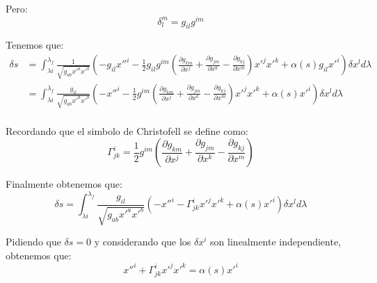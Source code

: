 \documentclass[12pt]{report}
\begin{document}
Pero:
	\begin{equation*}
		\delta^{m}_{l} = g_{il}g^{im}
	\end{equation*}

Tenemos que:
	\begin{align*}
		\delta s &=  \int^{\lambda_{f}}_{\lambda{i}} \frac{1}{\sqrt{g_{ab}x'^{a}x'^{b}}} \left( - g_{il}x''^{i}
													-\frac{1}{2}g_{il}g^{im}\left( \frac{\partial g_{km}}{\partial x^{j}} + \frac{\partial g_{jm}}{\partial x^{k}}-\frac{\partial g_{kj}}{\partial x^{m}} \right)x'^{j}x'^{k}
				                                        + \alpha\left( s \right) g_{il}x'^{i} 
														\right) \delta x^{l}  d\lambda \\
			     &=  \int^{\lambda_{f}}_{\lambda{i}} \frac{g_{il}}{\sqrt{g_{ab}x'^{a}x'^{b}}} \left( - x''^{i}
													-\frac{1}{2}g^{im}\left( \frac{\partial g_{km}}{\partial x^{j}} + \frac{\partial g_{jm}}{\partial x^{k}}-\frac{\partial g_{kj}}{\partial x^{m}} \right)x'^{j}x'^{k}
				                                        + \alpha\left( s \right) x'^{i} 
														\right) \delta x^{l}  d\lambda \\																																												
	\end{align*}
	
Recordando que el simbolo de Christofell se define como:
	\begin{equation*}
		\Gamma^{i}_{jk} = \frac{1}{2} g^{im} \left( \frac{\partial g_{km}}{\partial x^{j}} + \frac{\partial g_{jm}}{\partial x^{k}}-\frac{\partial g_{kj}}{\partial x^{m}}    \right)
	\end{equation*}
	
Finalmente obtenemos que:
	\begin{equation*}
		\delta s =  \int^{\lambda_{f}}_{\lambda{i}} \frac{g_{il}}{\sqrt{g_{ab}x'^{a}x'^{b}}} \left( - x''^{i}
													-\Gamma^{i}_{jk} x'^{j}x'^{k} + \alpha\left( s \right) x'^{i} 
														\right) \delta x^{l}  d\lambda 																																											
	\end{equation*}
	
Pidiendo que $\delta s = 0$ y considerando que los $\delta x^{i}$ son linealmente independiente, obtenemos que:
	\begin{equation*}
		x''^{i} + \Gamma^{i}_{jk} x'^{j}x'^{k} = \alpha\left( s \right) x'^{i}
	\end{equation*}
\end{document}
